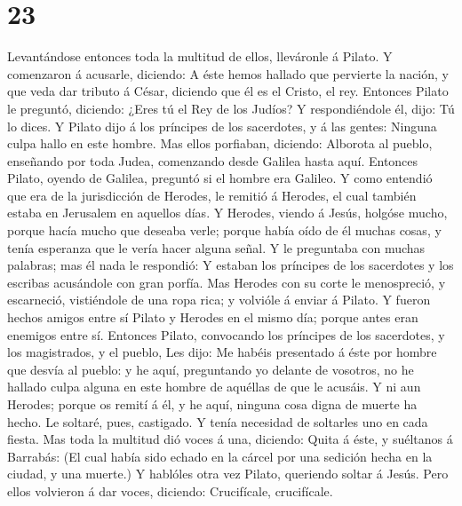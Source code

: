 \hypertarget{section-22}{%
\section{23}\label{section-22}}

 Levantándose entonces toda la multitud de ellos,
lleváronle á Pilato.  Y comenzaron á acusarle, diciendo: A
éste hemos hallado que pervierte la nación, y que veda dar tributo á
César, diciendo que él es el Cristo, el rey.  Entonces
Pilato le preguntó, diciendo: ¿Eres tú el Rey de los Judíos? Y
respondiéndole él, dijo: Tú lo dices.  Y Pilato dijo á los
príncipes de los sacerdotes, y á las gentes: Ninguna culpa hallo en este
hombre.  Mas ellos porfiaban, diciendo: Alborota al
pueblo, enseñando por toda Judea, comenzando desde Galilea hasta aquí.
 Entonces Pilato, oyendo de Galilea, preguntó si el hombre
era Galileo.  Y como entendió que era de la jurisdicción
de Herodes, le remitió á Herodes, el cual también estaba en Jerusalem en
aquellos días.  Y Herodes, viendo á Jesús, holgóse mucho,
porque hacía mucho que deseaba verle; porque había oído de él muchas
cosas, y tenía esperanza que le vería hacer alguna señal. 
Y le preguntaba con muchas palabras; mas él nada le respondió:
 Y estaban los príncipes de los sacerdotes y los escribas
acusándole con gran porfía.  Mas Herodes con su corte le
menospreció, y escarneció, vistiéndole de una ropa rica; y volvióle á
enviar á Pilato.  Y fueron hechos amigos entre sí Pilato
y Herodes en el mismo día; porque antes eran enemigos entre sí.
 Entonces Pilato, convocando los príncipes de los
sacerdotes, y los magistrados, y el pueblo,  Les dijo: Me
habéis presentado á éste por hombre que desvía al pueblo: y he aquí,
preguntando yo delante de vosotros, no he hallado culpa alguna en este
hombre de aquéllas de que le acusáis.  Y ni aun Herodes;
porque os remití á él, y he aquí, ninguna cosa digna de muerte ha hecho.
 Le soltaré, pues, castigado.  Y tenía
necesidad de soltarles uno en cada fiesta.  Mas toda la
multitud dió voces á una, diciendo: Quita á éste, y suéltanos á
Barrabás:  (El cual había sido echado en la cárcel por
una sedición hecha en la ciudad, y una muerte.)  Y
hablóles otra vez Pilato, queriendo soltar á Jesús.  Pero
ellos volvieron á dar voces, diciendo: Crucifícale, crucifícale.
